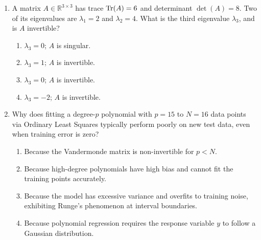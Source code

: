 \begin{enumerate}[label=\textbf{MCQ\arabic*.}]
    \item A matrix $A \in \mathbb{R}^{3 \times 3}$ has trace $\operatorname{Tr}(A) = 6$ and determinant $\det(A) = 8$. Two of its eigenvalues are $\lambda_1 = 2$ and $\lambda_2 = 4$. What is the third eigenvalue $\lambda_3$, and is $A$ invertible?
    \begin{enumerate}[label=(\alph*)]
        \item $\lambda_3 = 0$; $A$ is singular.
        \item $\lambda_3 = 1$; $A$ is invertible.
        \item $\lambda_3 = 0$; $A$ is invertible.
        \item $\lambda_3 = -2$; $A$ is invertible.
    \end{enumerate}

    \item Why does fitting a degree-$p$ polynomial with $p = 15$ to $N = 16$ data points via Ordinary Least Squares typically perform poorly on new test data, even when training error is zero?
    \begin{enumerate}[label=(\alph*)]
        \item Because the Vandermonde matrix is non-invertible for $p < N$.
        \item Because high-degree polynomials have high bias and cannot fit the training points accurately.
        \item Because the model has excessive variance and overfits to training noise, exhibiting Runge's phenomenon at interval boundaries.
        \item Because polynomial regression requires the response variable $y$ to follow a Gaussian distribution.
    \end{enumerate}
\end{enumerate}
